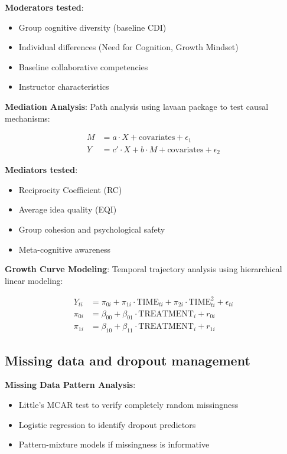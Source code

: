 \textbf{Moderators tested}:
\begin{itemize}
    \item Group cognitive diversity (baseline CDI)
    \item Individual differences (Need for Cognition, Growth Mindset)
    \item Baseline collaborative competencies
    \item Instructor characteristics
\end{itemize}

\textbf{Mediation Analysis}: Path analysis using lavaan package to test causal mechanisms:

\begin{align}
M &= a \cdot X + \text{covariates} + \epsilon_1 \label{eq:mediation-a}\\
Y &= c' \cdot X + b \cdot M + \text{covariates} + \epsilon_2 \label{eq:mediation-b}
\end{align}

\textbf{Mediators tested}:
\begin{itemize}
    \item Reciprocity Coefficient (RC)
    \item Average idea quality (EQI)
    \item Group cohesion and psychological safety
    \item Meta-cognitive awareness
\end{itemize}

\textbf{Growth Curve Modeling}: Temporal trajectory analysis using hierarchical linear modeling:

\begin{align}
Y_{ti} &= \pi_{0i} + \pi_{1i} \cdot \text{TIME}_{ti} + \pi_{2i} \cdot \text{TIME}^2_{ti} + \epsilon_{ti} \label{eq:level1}\\
\pi_{0i} &= \beta_{00} + \beta_{01} \cdot \text{TREATMENT}_i + r_{0i} \label{eq:level2-intercept}\\
\pi_{1i} &= \beta_{10} + \beta_{11} \cdot \text{TREATMENT}_i + r_{1i} \label{eq:level2-slope}
\end{align}



\subsection{Missing data and dropout management}

\textbf{Missing Data Pattern Analysis}:
\begin{itemize}
    \item Little's MCAR test to verify completely random missingness
    \item Logistic regression to identify dropout predictors
    \item Pattern-mixture models if missingness is informative
\end{itemize}


